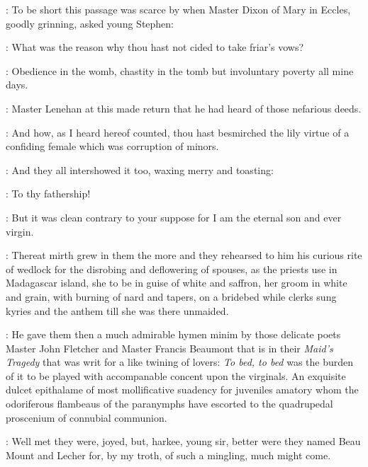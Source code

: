 

:
To be short this passage was scarce by when Master Dixon of Mary in
Eccles,
goodly grinning,
asked young Stephen:

\dixon:
What was the reason why thou hast not cided to take friar's vows?

\stephen:
Obedience in the womb,
chastity in the tomb
but involuntary poverty all mine days.

:
Master Lenehan at this made return that he had heard of
those nefarious deeds.

\lenehan:
And how,
as I heard hereof counted,
thou hast besmirched the lily
virtue of a confiding female
which was corruption of minors.

:
And they all intershowed it too,
waxing merry and toasting:

\All:
To thy fathership!

\stephen:
But it was clean contrary to your suppose for I am the
eternal son and ever virgin.

:
Thereat mirth grew in them the more and they
rehearsed to him his curious rite of wedlock for the disrobing and
deflowering of spouses,
as the priests use in Madagascar island,
she to
be in guise of white and saffron,
her groom in white and grain,
with
burning of nard and tapers,
on a bridebed while clerks sung kyries and
the anthem 
till she was there unmaided.

:
He gave them then a much admirable hymen minim by those
delicate poets Master John Fletcher and Master Francis Beaumont
that is in their \emph{Maid's Tragedy} that was writ for a like twining of lovers:
\emph{To bed,
to bed} was the burden of it to be played with
accompanable concent upon the virginals.
An exquisite dulcet epithalame of most mollificative suadency for
juveniles amatory whom the odoriferous flambeaus of the paranymphs have
escorted to the quadrupedal proscenium of connubial communion.

\dixon:
Well met they were,
joyed,
but,
harkee,
young sir,
better were they named Beau Mount and Lecher for,
by my troth,
of such a mingling,
much might come.

